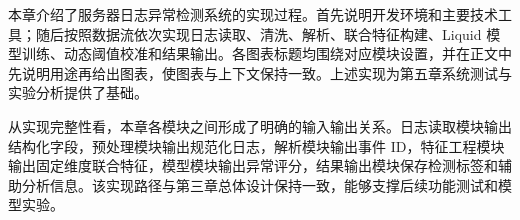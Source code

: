 本章介绍了服务器日志异常检测系统的实现过程。首先说明开发环境和主要技术工具；随后按照数据流依次实现日志读取、清洗、解析、联合特征构建、Liquid 模型训练、动态阈值校准和结果输出。各图表标题均围绕对应模块设置，并在正文中先说明用途再给出图表，使图表与上下文保持一致。上述实现为第五章系统测试与实验分析提供了基础。

从实现完整性看，本章各模块之间形成了明确的输入输出关系。日志读取模块输出结构化字段，预处理模块输出规范化日志，解析模块输出事件 ID，特征工程模块输出固定维度联合特征，模型模块输出异常评分，结果输出模块保存检测标签和辅助分析信息。该实现路径与第三章总体设计保持一致，能够支撑后续功能测试和模型实验。
